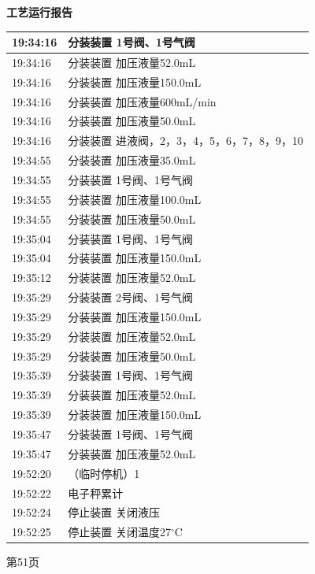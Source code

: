 \documentclass[UTF8,10pt,a4paper,fontset=fandol]{ctexart}
\begin{document}
\vspace{1em}

\noindent
\begin{minipage}[t]{0.48\linewidth}
\centering
\textbf{工艺运行报告}\\[2pt]
\small
\begin{tabular}{|p{1.35cm}|p{4.65cm}|}
\hline
19:34:16 & 分装装置 1号阀、1号气阀 \\ \hline
19:34:16 & 分装装置 加压液量52.0mL \\ \hline
19:34:16 & 分装装置 加压液量150.0mL \\ \hline
19:34:16 & 分装装置 加压液量600mL/min \\ \hline
19:34:16 & 分装装置 加压液量50.0mL \\ \hline
19:34:16 & 分装装置 进液阀，2，3，4，5，6，7，8，9，10 \\ \hline
19:34:55 & 分装装置 加压液量35.0mL \\ \hline
19:34:55 & 分装装置 1号阀、1号气阀 \\ \hline
19:34:55 & 分装装置 加压液量100.0mL \\ \hline
19:34:55 & 分装装置 加压液量50.0mL \\ \hline
19:35:04 & 分装装置 1号阀、1号气阀 \\ \hline
19:35:04 & 分装装置 加压液量150.0mL \\ \hline
19:35:12 & 分装装置 加压液量52.0mL \\ \hline
19:35:29 & 分装装置 2号阀、1号气阀 \\ \hline
19:35:29 & 分装装置 加压液量150.0mL \\ \hline
19:35:29 & 分装装置 加压液量52.0mL \\ \hline
19:35:29 & 分装装置 加压液量50.0mL \\ \hline
19:35:39 & 分装装置 1号阀、1号气阀 \\ \hline
19:35:39 & 分装装置 加压液量52.0mL \\ \hline
19:35:39 & 分装装置 加压液量150.0mL \\ \hline
19:35:47 & 分装装置 1号阀、1号气阀 \\ \hline
19:35:47 & 分装装置 加压液量52.0mL \\ \hline
19:52:20 & （临时停机）1 \\ \hline
19:52:22 & 电子秤累计 \\ \hline
19:52:24 & 停止装置 关闭液压 \\ \hline
19:52:25 & 停止装置 关闭温度27$^\circ$C \\ \hline
\end{tabular}

\vspace{2pt}
第51页
\end{minipage}
\end{document}
